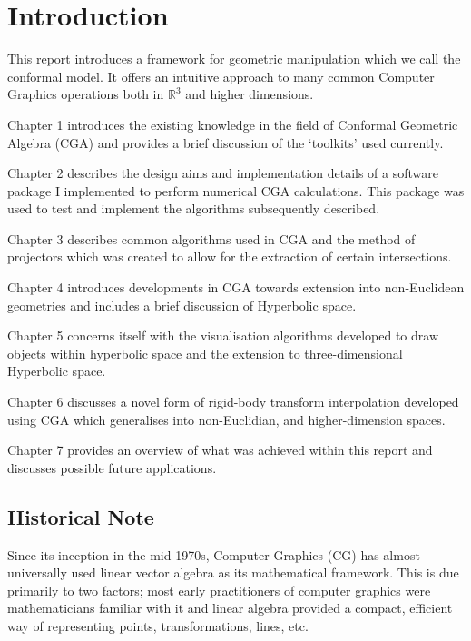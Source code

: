 \begin{savequote}
%
\end{savequote}

\chapter{Introduction}

This report introduces a framework for geometric manipulation
which we call the conformal model. It offers an intuitive approach to many
common Computer Graphics operations both in $\mathbb{R}^3$ and
higher dimensions.

Chapter 1 introduces the existing knowledge in the field of
Conformal Geometric Algebra (CGA) and provides a brief discussion of
the `toolkits' used currently.

Chapter 2 describes the design aims and implementation details of a
software package I implemented to perform numerical CGA calculations.
This package was used to test and implement the algorithms subsequently
described.

Chapter 3 describes common algorithms used in CGA and the method of
projectors which was created to allow for the extraction of certain 
intersections.

Chapter 4 introduces developments in CGA towards extension into non-Euclidean
geometries and includes a brief discussion of Hyperbolic space.

Chapter 5 concerns itself with the visualisation algorithms developed to
draw objects within hyperbolic space and the extension to three-dimensional
Hyperbolic space.

Chapter 6 discusses a novel form of rigid-body transform interpolation
developed using CGA which generalises into non-Euclidian, and higher-dimension
spaces.

Chapter 7 provides an overview of what was achieved within this report and
discusses possible future applications.

\section{Historical Note}
Since its inception in the mid-1970s, Computer Graphics (CG) has almost
universally used linear vector algebra as its mathematical framework.
This is due primarily to two factors; most early practitioners of
computer graphics were mathematicians familiar with it and 
linear algebra provided a compact, efficient way of representing points, 
transformations, lines, etc.

